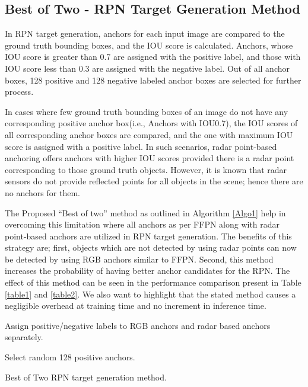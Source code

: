 \documentclass{article}
\begin{document}
\subsection{Best of Two - RPN Target Generation Method}
\label{subsec:B2}
In RPN target generation, anchors for each input image are compared to the ground truth bounding boxes, and the IOU score is calculated. Anchors, whose IOU score is greater than 0.7 are assigned with the positive label, and those with IOU score less than 0.3 are assigned with the negative label. Out of all anchor boxes, 128 positive and 128 negative labeled anchor boxes are selected for further process.

In cases where few ground truth bounding boxes of an image do not have any corresponding positive anchor box(i.e., Anchors with IOU0.7), the IOU scores of all corresponding anchor boxes are compared, and the one with maximum IOU score is assigned with a positive label. In such scenarios, radar point-based anchoring offers anchors with higher IOU scores provided there is a radar point corresponding to those ground truth objects. However, it is known that radar sensors do not provide reflected points for all objects in the scene; hence there are no anchors for them.

The Proposed “Best of two” method as outlined in Algorithm \ref{Algo1} help in overcoming this limitation where all anchors as per FFPN along with radar point-based anchors are utilized in RPN target generation. The benefits of this strategy are; first, objects which are not detected by using radar points can now be detected by using RGB anchors similar to FFPN. Second, this method increases the probability of having better anchor candidates for the RPN. The effect of this method can be seen in the performance comparison present in Table \ref{table1} and \ref{table2}. We also want to highlight that the stated method causes a negligible overhead at training time and no increment in inference time.
\begin{algorithm}
 
 Assign positive/negative labels to RGB anchors and radar based anchors separately.\
 
 Select random 128 positive anchors.\
 
 \caption{Best of Two RPN target generation method.}
\label{Algo1}
\end{algorithm}
\end{document}
